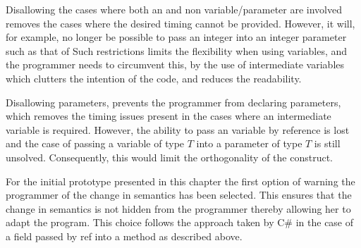Disallowing the  cases where both an  and non  variable/parameter are involved removes the cases where the desired timing cannot be provided. However, it will, for example, no longer be possible to pass an  integer into an  integer parameter such as that of  Such restrictions limits the flexibility when using  variables, and the programmer needs to circumvent this,  by the use of intermediate variables which clutters the intention of the code, and reduces the readability.

Disallowing  parameters, prevents the programmer from declaring  parameters, which removes the timing issues present in the cases where an intermediate  variable is required. However, the ability to pass an  variable by reference is lost and the case of passing a variable of type  $T$ into a parameter of type $T$ is still unsolved. Consequently, this would limit the orthogonality of the  construct.

For the initial prototype presented in this chapter the first option of warning the programmer of the change in semantics has been selected. This ensures that the change in semantics is not hidden from the programmer thereby allowing her to adapt the program. This choice follows the approach taken by C\# in the case of a  field passed by ref into a method as described above.


\worksheetend